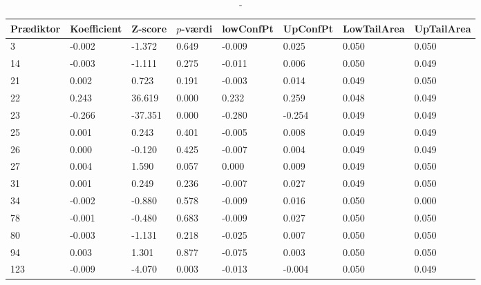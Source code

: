 \begin{table}[ht] 
\centering 
\begin{tabular}{llllllll}
\toprule
Prædiktor & Koefficient & Z-score & \(p\)-værdi & lowConfPt & UpConfPt & LowTailArea & UpTailArea \\
\midrule
3 & -0.002 & -1.372 & 0.649 & -0.009 & 0.025 & 0.050 & 0.050 \\
14 & -0.003 & -1.111 &  0.275 &   -0.011 &   0.006 & 0.050 & 0.049 \\
21 & 0.002 & 0.723 & 0.191 & -0.003 & 0.014 & 0.049 & 0.050 \\
22 & 0.243 & 36.619 & 0.000 & 0.232 & 0.259 & 0.048 & 0.049 \\
23 & -0.266 & -37.351 & 0.000 & -0.280 & -0.254 & 0.049 & 0.049 \\
25 & 0.001 & 0.243 & 0.401 & -0.005 & 0.008 & 0.049 & 0.049 \\
26 &  0.000 & -0.120 &  0.425 & -0.007 & 0.004 & 0.049 & 0.049 \\
27 & 0.004 & 1.590 & 0.057 & 0.000 & 0.009 &  0.049 & 0.050 \\
31 & 0.001 & 0.249 & 0.236 & -0.007 & 0.027  & 0.049 & 0.050 \\
34 & -0.002 & -0.880 & 0.578 & -0.009 & 0.016 & 0.050 & 0.000 \\
78 & -0.001 & -0.480 & 0.683 & -0.009 & 0.027 & 0.050 & 0.050 \\
80 & -0.003 & -1.131 &  0.218 & -0.025 & 0.007  & 0.050 & 0.050 \\
94 & 0.003 & 1.301 & 0.877 & -0.075 & 0.003 & 0.050 & 0.050 \\
123 & -0.009 & -4.070 & 0.003 & -0.013 & -0.004 & 0.050 & 0.049 \\
\bottomrule
\end{tabular}  
\caption{-}
\end{table} 